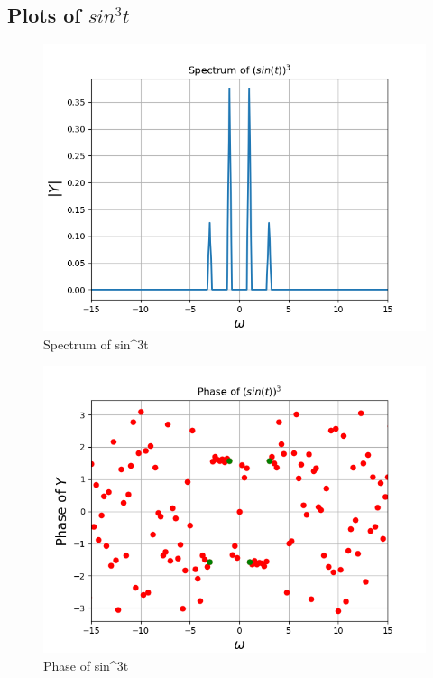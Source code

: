 \documentclass[11pt]{article}
\begin{document}
\subsection{Plots of $sin^3t$}
\begin{figure}[H]
    \centering
    \includegraphics[scale = 0.75]{Figure_4a.png}
    \caption{Spectrum of sin^3t}
\end{figure}
\begin{figure}[H]
    \centering
    \includegraphics[scale = 0.75]{Figure_4b.png}
    \caption{Phase of sin^3t}
\end{figure}
\end{document}
